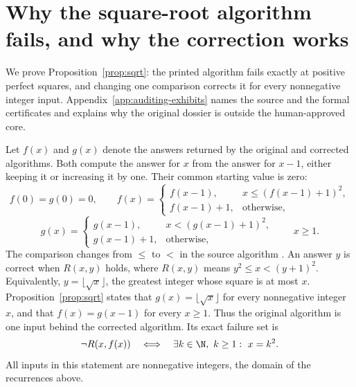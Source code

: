 \section{Why the square-root algorithm fails, and why the correction works}
\label{app:sqrt-proof}
We prove Proposition~\ref{prop:sqrt}: the printed algorithm fails exactly at positive perfect squares, and changing one comparison corrects it for every nonnegative integer input. Appendix~\ref{app:auditing-exhibits} names the source and the formal certificates and explains why the original dossier is outside the human-approved core.

Let $f(x)$ and $g(x)$ denote the answers returned by the original and corrected
algorithms. Both compute the answer for $x$ from the answer for $x-1$, either
keeping it or increasing it by one. Their common starting value is zero:
\[
f(0)=g(0)=0,\qquad
f(x)=\begin{cases}f(x-1),&x\le(f(x-1)+1)^2,\\f(x-1)+1,&\text{otherwise},\end{cases}
\]
\[
g(x)=\begin{cases}g(x-1),&x<(g(x-1)+1)^2,\\g(x-1)+1,&\text{otherwise},\end{cases}
\qquad x\ge1.
\]
The comparison changes from $\le$ to $<$ in the source algorithm
. An answer $y$ is correct when
$R(x,y)$ holds, where $R(x,y)$ means $y^2\le x<(y+1)^2$.
Equivalently, $y=\lfloor\sqrt{x}\rfloor$, the greatest integer whose square
is at most $x$. Proposition~\ref{prop:sqrt} states that
$g(x)=\lfloor\sqrt{x}\rfloor$ for every nonnegative integer $x$, and that
$f(x)=g(x-1)$ for every $x\ge1$. Thus the original algorithm is one input
behind the corrected algorithm. Its exact failure set is
\begin{equation}
\neg R(x,f(x))\quad\Longleftrightarrow\quad
\exists k\in\N,\ k\ge1:\ x=k^2.
\label{eq:sqrt}
\end{equation}
All inputs in this statement are nonnegative integers, the domain of the
recurrences above.

